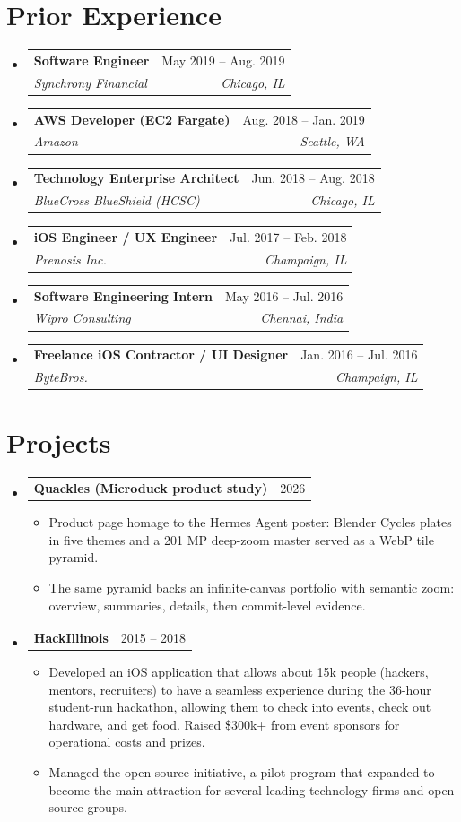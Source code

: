 \documentclass[letterpaper,11pt]{article}
\makeatletter
\newcommand{\resumeItem}[1]{\item\small{#1 \vspace{-2pt}}}
\newcommand{\resumeSubheading}[4]{%
  \vspace{-2pt}\item
    \begin{tabular*}{0.97\textwidth}[t]{l@{\extracolsep{\fill}}r}
      \textbf{#1} & #2 \\
      \textit{\small#3} & \textit{\small #4} \\
    \end{tabular*}\vspace{-7pt}
}
\newcommand{\resumeProjectHeading}[2]{%
    \item
    \begin{tabular*}{0.97\textwidth}{l@{\extracolsep{\fill}}r}
      \small#1 & #2 \\
    \end{tabular*}\vspace{-7pt}
}
\newcommand{\resumeSubHeadingListStart}{\begin{itemize}[leftmargin=0.15in, label={}]}
\newcommand{\resumeSubHeadingListEnd}{\end{itemize}}
\newcommand{\resumeItemListStart}{\begin{itemize}}
\newcommand{\resumeItemListEnd}{\end{itemize}\vspace{-5pt}}
\makeatother
\begin{document}
\section{Prior Experience}
  \resumeSubHeadingListStart
    \resumeSubheading{Software Engineer}{May 2019 -- Aug. 2019}{Synchrony Financial}{Chicago, IL}\vspace{-2pt}
    \resumeSubheading{AWS Developer (EC2 Fargate)}{Aug. 2018 -- Jan. 2019}{Amazon}{Seattle, WA}\vspace{-2pt}
    \resumeSubheading{Technology Enterprise Architect}{Jun. 2018 -- Aug. 2018}{BlueCross BlueShield (HCSC)}{Chicago, IL}\vspace{-2pt}
    \resumeSubheading{iOS Engineer / UX Engineer}{Jul. 2017 -- Feb. 2018}{Prenosis Inc.}{Champaign, IL}\vspace{-2pt}
    \resumeSubheading{Software Engineering Intern}{May 2016 -- Jul. 2016}{Wipro Consulting}{Chennai, India}\vspace{-2pt}
    \resumeSubheading{Freelance iOS Contractor / UI Designer}{Jan. 2016 -- Jul. 2016}{ByteBros.}{Champaign, IL}\vspace{-2pt}
  \resumeSubHeadingListEnd

\section{Projects}
  \resumeSubHeadingListStart
      \resumeProjectHeading
          {\textbf{Quackles (Microduck product study)}}{2026}
          \resumeItemListStart
            \resumeItem{Product page homage to the Hermes Agent poster: Blender Cycles plates in five themes and a 201 MP deep-zoom master served as a WebP tile pyramid.}
            \resumeItem{The same pyramid backs an infinite-canvas portfolio with semantic zoom: overview, summaries, details, then commit-level evidence.}
          \resumeItemListEnd
      \resumeProjectHeading
          {\textbf{HackIllinois}}{2015 -- 2018}
          \resumeItemListStart
            \resumeItem{Developed an iOS application that allows about 15k people (hackers, mentors, recruiters) to have a seamless experience during the 36-hour student-run hackathon, allowing them to check into events, check out hardware, and get food. Raised \$300k+ from event sponsors for operational costs and prizes.}
            \resumeItem{Managed the open source initiative, a pilot program that expanded to become the main attraction for several leading technology firms and open source groups.}
          \resumeItemListEnd
  \resumeSubHeadingListEnd
\end{document}
